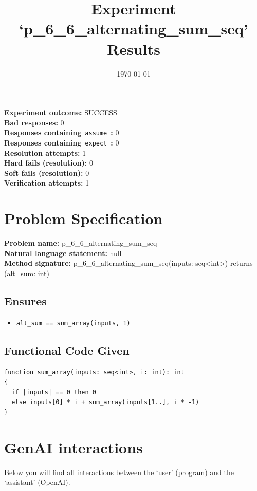 \documentclass{article}
\begin{document}
\title{Experiment `p\_6\_6\_alternating\_sum\_seq' Results}
\author{\today}
\date{}
\maketitle
\textbf{Experiment outcome: }SUCCESS
\\\textbf{Bad responses: }0
\\\textbf{Responses containing}~\texttt{assume}~\textbf{: }0
\\\textbf{Responses containing}~\texttt{expect}~\textbf{: }0
\\\textbf{Resolution attempts: }1
\\\textbf{Hard fails (resolution): }0
\\\textbf{Soft fails (resolution): }0
\\\textbf{Verification attempts: }1
\section*{Problem Specification}
\textbf{Problem name: }p\_6\_6\_alternating\_sum\_seq
\\\textbf{Natural language statement: }null
\\\textbf{Method signature: }p\_6\_6\_alternating\_sum\_seq(inputs: seq<int>) returns (alt\_sum: int)
\subsection*{Ensures}
\begin{itemize}
\item \texttt{alt\_sum == sum\_array(inputs, 1)}
\end{itemize}
\subsection*{Functional Code Given}
\begin{lstlisting}
function sum_array(inputs: seq<int>, i: int): int
{
  if |inputs| == 0 then 0
  else inputs[0] * i + sum_array(inputs[1..], i * -1)
}
\end{lstlisting}
\clearpage
\section*{GenAI interactions}
Below you will find all interactions between the `user' (program) and the `assistant' (OpenAI).
\end{document}
